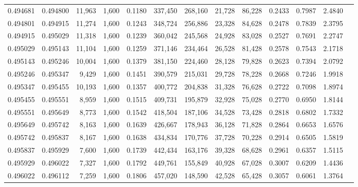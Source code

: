 \begin{tabular}{rrrrrrrrrrrrr}
0.494681 & 0.494800 & 11,963 & 1,600 &                                     0.1180 & 337,450 & 268,160 &  21,728 &  86,228 & 0.2433 & 0.7987 & 2.4840 \\
0.494801 & 0.494915 & 11,274 & 1,600 &                                     0.1243 & 348,724 & 256,886 &  23,328 &  84,628 & 0.2478 & 0.7839 & 2.3795 \\
0.494915 & 0.495029 & 11,318 & 1,600 &                                     0.1239 & 360,042 & 245,568 &  24,928 &  83,028 & 0.2527 & 0.7691 & 2.2747 \\
0.495029 & 0.495143 & 11,104 & 1,600 &                                     0.1259 & 371,146 & 234,464 &  26,528 &  81,428 & 0.2578 & 0.7543 & 2.1718 \\
0.495143 & 0.495246 & 10,004 & 1,600 &                                     0.1379 & 381,150 & 224,460 &  28,128 &  79,828 & 0.2623 & 0.7394 & 2.0792 \\
0.495246 & 0.495347 &  9,429 & 1,600 &                                     0.1451 & 390,579 & 215,031 &  29,728 &  78,228 & 0.2668 & 0.7246 & 1.9918 \\
0.495347 & 0.495455 & 10,193 & 1,600 &                                     0.1357 & 400,772 & 204,838 &  31,328 &  76,628 & 0.2722 & 0.7098 & 1.8974 \\
0.495455 & 0.495551 &  8,959 & 1,600 &                                     0.1515 & 409,731 & 195,879 &  32,928 &  75,028 & 0.2770 & 0.6950 & 1.8144 \\
0.495551 & 0.495649 &  8,773 & 1,600 &                                     0.1542 & 418,504 & 187,106 &  34,528 &  73,428 & 0.2818 & 0.6802 & 1.7332 \\
0.495649 & 0.495742 &  8,163 & 1,600 &                                     0.1639 & 426,667 & 178,943 &  36,128 &  71,828 & 0.2864 & 0.6653 & 1.6576 \\
0.495742 & 0.495837 &  8,167 & 1,600 &                                     0.1638 & 434,834 & 170,776 &  37,728 &  70,228 & 0.2914 & 0.6505 & 1.5819 \\
0.495837 & 0.495929 &  7,600 & 1,600 &                                     0.1739 & 442,434 & 163,176 &  39,328 &  68,628 & 0.2961 & 0.6357 & 1.5115 \\
0.495929 & 0.496022 &  7,327 & 1,600 &                                     0.1792 & 449,761 & 155,849 &  40,928 &  67,028 & 0.3007 & 0.6209 & 1.4436 \\
0.496022 & 0.496112 &  7,259 & 1,600 &                                     0.1806 & 457,020 & 148,590 &  42,528 &  65,428 & 0.3057 & 0.6061 & 1.3764 \\

\end{tabular}
